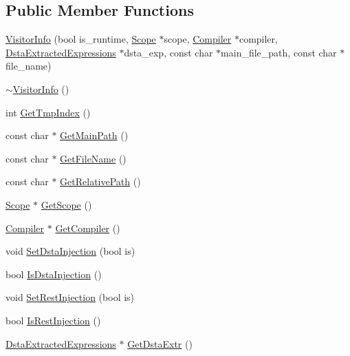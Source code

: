 \subsection*{Public Member Functions}
\begin{DoxyCompactItemize}
\item 
\hyperlink{classmocha_1_1_visitor_info_a5944b16cb83c3a1df009d0a053b8b9ff}{VisitorInfo} (bool is\_\-runtime, \hyperlink{classmocha_1_1_scope}{Scope} $\ast$scope, \hyperlink{classmocha_1_1_compiler}{Compiler} $\ast$compiler, \hyperlink{classmocha_1_1_dsta_extracted_expressions}{DstaExtractedExpressions} $\ast$dsta\_\-exp, const char $\ast$main\_\-file\_\-path, const char $\ast$file\_\-name)
\item 
\hyperlink{classmocha_1_1_visitor_info_ae2ba5aaa7fa77f47a8dd67849e8641ce}{$\sim$VisitorInfo} ()
\item 
int \hyperlink{classmocha_1_1_visitor_info_a0b8fab810d5059ef5d6f09c3e6ef4a78}{GetTmpIndex} ()
\item 
const char $\ast$ \hyperlink{classmocha_1_1_visitor_info_a58ca66562e8a4a5b993bff83e3a286d4}{GetMainPath} ()
\item 
const char $\ast$ \hyperlink{classmocha_1_1_visitor_info_afa39e1bb52b406374d46186b49329745}{GetFileName} ()
\item 
const char $\ast$ \hyperlink{classmocha_1_1_visitor_info_a1c2620c43282cf2aaf90fe2ec448f9bd}{GetRelativePath} ()
\item 
\hyperlink{classmocha_1_1_scope}{Scope} $\ast$ \hyperlink{classmocha_1_1_visitor_info_a7d5ddae54798504b74019f2f1ea73610}{GetScope} ()
\item 
\hyperlink{classmocha_1_1_compiler}{Compiler} $\ast$ \hyperlink{classmocha_1_1_visitor_info_a256d0aef9999defd38f532d8cd8eea63}{GetCompiler} ()
\item 
void \hyperlink{classmocha_1_1_visitor_info_ad9866ee003a545ac20ee4259f476447f}{SetDstaInjection} (bool is)
\item 
bool \hyperlink{classmocha_1_1_visitor_info_a8ff7424489df40fdc50acb440232ea8c}{IsDstaInjection} ()
\item 
void \hyperlink{classmocha_1_1_visitor_info_ad98f148af97270fba24edac25c828a6f}{SetRestInjection} (bool is)
\item 
bool \hyperlink{classmocha_1_1_visitor_info_a81335cc7271b49551febbc9fe9d9d903}{IsRestInjection} ()
\item 
\hyperlink{classmocha_1_1_dsta_extracted_expressions}{DstaExtractedExpressions} $\ast$ \hyperlink{classmocha_1_1_visitor_info_a97ab16ac75a9c16a029a9450372c3154}{GetDstaExtr} ()

\end{DoxyCompactItemize}
